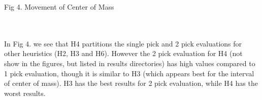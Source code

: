 \documentclass[11pt]{article} %
\begin{document}
\begin{center}
\caption{Fig 4. Movement of Center of Mass}
\end{center}
\\
\\In Fig 4. we see that H4 partitions the single pick and 2 pick evaluations for other heuristics (H2, H3 and H6). However the 2 pick evaluation for H4 (not show in the figures, but listed in results directories) has high values compared to  1 pick evaluation, though it is similar to H3 (which appears best for the interval of center of mass). H3 has the best results for 2 pick evaluation, while H4 has the worst results.
\end{document}
